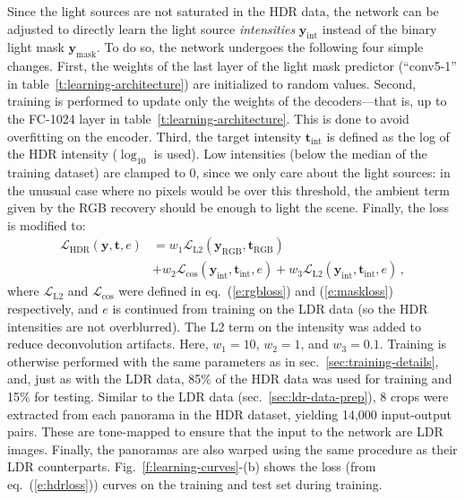 Since the light sources are not saturated in the HDR data, the network can be adjusted to directly learn the light source \emph{intensities} $\mathbf{y}_\text{int}$ instead of the binary light mask $\mathbf{y}_\text{mask}$. To do so, the network undergoes the following four simple changes. First, the weights of the last layer of the light mask predictor (``conv5-1'' in table~\ref{t:learning-architecture}) are initialized to random values. Second, training is performed to update only the weights of the decoders---that is, up to the FC-1024 layer in table~\ref{t:learning-architecture}. This is done to avoid overfitting on the encoder. Third, the target intensity $\mathbf{t}_\text{int}$ is defined as the log of the HDR intensity ($\log_{10}$ is used). Low intensities (below the median of the training dataset) are clamped to 0, since we only care about the light sources: in the unusual case where no pixels would be over this threshold, the ambient term given by the RGB recovery should be enough to light the scene. Finally, the loss is modified to:
%
\begin{align}
    \mathcal{L}_\text{HDR}(\mathbf{y}, \mathbf{t}, e) &= w_1 \mathcal{L}_\text{L2}(\mathbf{y}_\text{RGB}, \mathbf{t}_\text{RGB}) \nonumber \\ 
    &+ w_2 \mathcal{L}_\text{cos}(\mathbf{y}_\text{int}, \mathbf{t}_\text{int}, e)
    + w_3 \mathcal{L}_\text{L2}(\mathbf{y}_\text{int}, \mathbf{t}_\text{int}, e)  \,,
\label{e:hdrloss}
\end{align}
%
where $\mathcal{L}_\text{L2}$ and $\mathcal{L}_\text{cos}$ were defined in eq.~(\ref{e:rgbloss}) and (\ref{e:maskloss}) respectively, and $e$ is continued from training on the LDR data (so the HDR intensities are not overblurred). The L2 term on the intensity was added to reduce deconvolution artifacts. Here, $w_1 = 10$, $w_2 = 1$, and $w_3 = 0.1$. Training is otherwise performed with the same parameters as in sec.~\ref{sec:training-details}, and, just as with the LDR data, 85\% of the HDR data was used for training and 15\% for testing. Similar to the LDR data (sec.~\ref{sec:ldr-data-prep}), 8 crops were extracted from each panorama in the HDR dataset, yielding 14,000 input-output pairs. These are tone-mapped to ensure that the input to the network are LDR images. Finally, the panoramas are also warped using the same procedure as their LDR counterparts. Fig.~\ref{f:learning-curves}-(b) shows the loss (from eq.~(\ref{e:hdrloss})) curves on the training and test set during training. 


